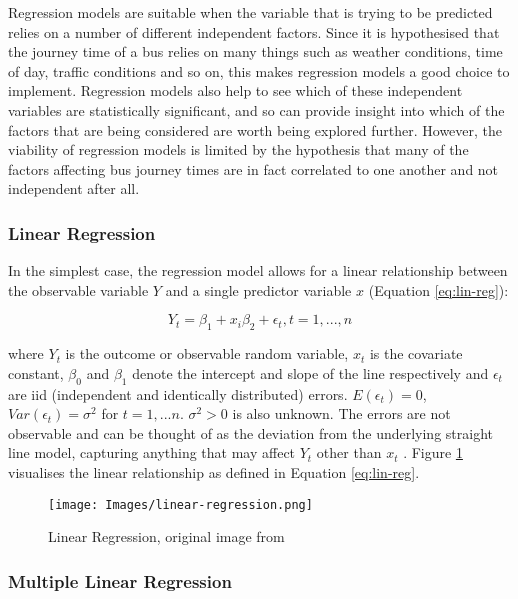 Regression models are suitable when the variable that is trying to be predicted relies on a number of different independent factors. Since it is hypothesised that the journey time of a bus relies on many things such as weather conditions, time of day, traffic conditions and so on, this makes regression models a good choice to implement. Regression models also help to see which of these independent variables are statistically significant, and so can provide insight into which of the factors that are being considered are worth being explored further. However, the viability of regression models is limited by the hypothesis that many of the factors affecting bus journey times are in fact correlated to one another and not independent after all. 

\subsubsection{Linear Regression}

In the simplest case, the regression model allows for a linear relationship between the observable variable $Y$ and a single predictor variable $x$ (Equation \ref{eq:lin-reg}): 

\begin{equation}
    Y_t = \beta_1 + x_i\beta_2 + \epsilon_t, t = 1, ..., n
    \label{eq:lin-reg}
\end{equation}

where $Y_t$ is the outcome or observable random variable, $x_t$ is the covariate constant, $\beta_0$ and $\beta_1$ denote the intercept and slope of the line respectively and $\epsilon_t$ are iid (independent and identically distributed) errors. $E(\epsilon_t) = 0$, $Var(\epsilon_t) = \sigma^2$ for $t = 1,...n$. $\sigma^2 > 0$ is also unknown. The errors are not observable and can be thought of as the deviation from the underlying straight line model, capturing anything that may affect $Y_t$ other than $x_t$ \cite{forecasting-book}. Figure \ref{fig:lin-reg} visualises the linear relationship as defined in Equation \ref{eq:lin-reg}.

\begin{figure}[H]
\begin{center}
    \texttt{[image: Images/linear-regression.png]}
    \caption{Linear Regression, original image from \cite{forecasting-book}}
    \label{fig:lin-reg}
\end{center}
\end{figure}

\subsubsection{Multiple Linear Regression}

